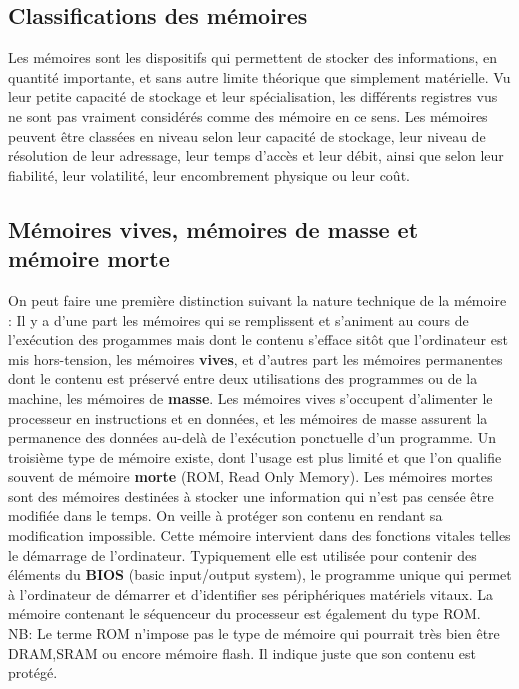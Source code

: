 \documentclass{report}
\begin{document}
\subsection{Classifications des mémoires}
Les mémoires sont les dispositifs qui permettent de stocker des informations, en quantité importante, et sans autre limite théorique que simplement matérielle. Vu leur petite capacité de stockage et leur spécialisation, les différents registres vus ne sont pas vraiment considérés comme des mémoire en ce sens. Les mémoires peuvent être classées en niveau selon leur capacité de stockage, leur niveau de résolution de leur adressage, leur temps d'accès et leur débit, ainsi que selon leur fiabilité, leur volatilité, leur encombrement physique ou leur coût.\\

\subsection{Mémoires vives, mémoires de masse et mémoire morte}
On peut faire une première distinction suivant la nature technique de la mémoire : Il y a d'une part les mémoires qui se remplissent et s'animent au cours de l'exécution des progammes mais dont le contenu s'efface sitôt que l'ordinateur est mis hors-tension, les mémoires {\bf vives}, et d'autres part les mémoires permanentes dont le contenu est préservé entre deux utilisations des programmes ou de la machine, les mémoires de {\bf masse}. Les mémoires vives s'occupent d'alimenter le processeur en instructions et en données, et les mémoires de masse assurent la permanence des données au-delà de l'exécution ponctuelle d'un programme.  Un troisième type de mémoire existe, dont l'usage est plus limité et que l'on qualifie souvent de mémoire {\bf morte} (ROM, Read Only Memory). Les mémoires mortes sont des mémoires destinées à stocker une information qui n'est pas censée être modifiée dans le temps. On veille à protéger son contenu en rendant sa modification impossible. Cette mémoire intervient dans des fonctions vitales telles le démarrage de l'ordinateur. Typiquement elle est utilisée pour contenir des éléments du {\bf BIOS} (basic input/output system), le programme unique qui permet à l'ordinateur de démarrer et d'identifier ses périphériques matériels vitaux. La mémoire contenant le séquenceur du processeur est également du type ROM.\\
NB: Le terme ROM n'impose pas le type de mémoire qui pourrait très bien être DRAM,SRAM ou encore mémoire flash. Il indique juste que son contenu est protégé.
\end{document}
